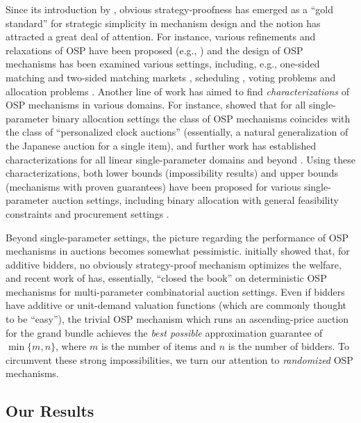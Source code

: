 Since its introduction by \cite{li}, obvious strategy-proofness has emerged as a ``gold standard'' for strategic simplicity in mechanism design and the notion has attracted a great deal of attention.  For instance, various refinements and relaxations of OSP have been proposed (e.g., \cite{pycia2023theory,nagel2023measure,FV23}) and the design of OSP mechanisms has been examined various settings, including, e.g., one-sided matching \cite{troyan2019obviously} and two-sided  matching  markets \cite{AG18,Thomas21}, scheduling \cite{ferraioli2019obviously}, voting problems \cite{BG17,arribillaga2020obvious} and allocation problems \cite{BG17}.  Another line of work has aimed to find \emph{characterizations} of OSP mechanisms in various domains.  For instance, \cite{li} showed that for all single-parameter binary allocation settings the class of OSP mechanisms coincides with the class of ``personalized clock auctions'' (essentially, a natural generalization of the Japanese auction for a single item), and further work has  established characterizations for all linear single-parameter domains \cite{carmine1,carmine2} and beyond \cite{pycia2023obviously,Mackenzie20}.  Using these characterizations, both lower bounds (impossibility results) and upper bounds (mechanisms with proven guarantees) have been proposed for various single-parameter auction settings, including binary allocation with general feasibility constraints \cite{DGR14,CGS22,FGGS22}  and procurement  settings \cite{BGGST22}.  

Beyond single-parameter settings, the picture regarding the performance of OSP mechanisms in auctions becomes somewhat pessimistic.
\cite{BG17} initially showed that, for additive bidders, no obviously strategy-proof mechanism optimizes the welfare,
and recent work of \cite{Ron24} has, essentially, ``closed the book'' on deterministic OSP mechanisms for multi-parameter combinatorial auction settings.  Even if bidders have additive or unit-demand valuation functions (which are commonly thought to be  ``easy''), the trivial OSP mechanism which 
runs an ascending-price auction for the grand bundle achieves the \emph{best possible} approximation guarantee of $\min\{m,n\}$, where $m$ is the number of items and $n$ is the number of bidders. 
To  circumvent these strong impossibilities, we turn our attention to \emph{randomized} OSP mechanisms.
 

\subsection{Our Results}



